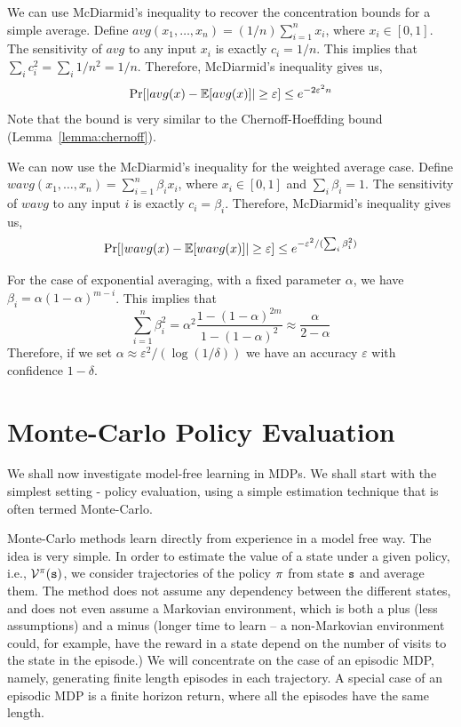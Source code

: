 {We can use McDiarmid's inequality to recover the concentration bounds
for a simple average. Define $avg(x_1, \ldots ,
x_n)=(1/n)\sum_{i=1}^n x_i$, where $x_i\in[0,1]$. The sensitivity of
$avg$ to any input $x_i$ is exactly $c_i=1/n$. This implies that
$\sum_i c_i^2=\sum_i 1/n^2=1/n$. Therefore, McDiarmid's inequality
gives us,
\[
\Pr[|avg(x)-\mathbb{E}[avg(x)]|\geq \varepsilon]\leq e^{-2\varepsilon^2n}
\]
Note that the bound is very similar to the Chernoff-Hoeffding bound
(Lemma~\ref{lemma:chernoff}).

We can now use the McDiarmid's inequality for the weighted average
case. Define $wavg(x_1, \ldots , x_n)=\sum_{i=1}^n \beta_i x_i$,
where $x_i\in[0,1]$ and $\sum_i \beta_i=1$. The sensitivity of
$wavg$ to any input $i$ is exactly $c_i=\beta_i$.
Therefore, McDiarmid's inequality gives us,
\[
\Pr[|wavg(x)-\mathbb{E}[wavg(x)]|\geq \varepsilon]\leq
e^{-\varepsilon^2/(\sum_i \beta_i^2)}
\]

For the case of exponential averaging, with a fixed parameter $\alpha$, we have $\beta_i=\alpha(1-\alpha)^{m-i}$. This implies
that
\[
\sum_{i=1}^n \beta_i^2 =
\alpha^2\frac{1-(1-\alpha)^{2m}}{1-(1-\alpha)^2}\approx
\frac{\alpha}{2-\alpha}
\]
Therefore, if we set $\alpha\approx \varepsilon^2/(\log (1/\delta))$
we have an accuracy $\varepsilon$ with confidence $1-\delta$.
}


\section{Monte-Carlo Policy Evaluation}
\label{sec:MC}
We shall now investigate model-free learning in MDPs. We shall start with the simplest setting - policy evaluation, using a simple estimation technique that is often termed Monte-Carlo. 


Monte-Carlo methods learn directly from experience in a model free
way. The idea is very simple. In order to estimate the value of a
state under a given policy, i.e., $\mathcal{V}^\pi({\tt s})$, we
consider trajectories of the policy $\pi$ from state ${\tt s}$
and average them. The method does not assume any dependency between
the different states, and does not even assume a Markovian
environment, which is both a plus (less assumptions) and a minus
(longer time to learn -- a non-Markovian environment could, for
example, have the reward in a state depend on the number of visits
to the state in the episode.) We will concentrate on the case of an
episodic MDP, namely, generating finite length episodes in each
trajectory. A special case of an episodic MDP is a finite horizon
return, where all the episodes have the same length.

